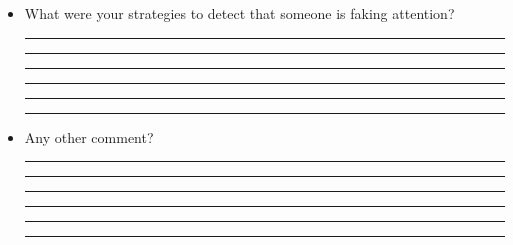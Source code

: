 \documentclass[]{simple-thesis}
\begin{document}
\begin{appendices}
\begin{itemize}

\item What were your strategies to detect that someone is faking attention?

  \rule{\linewidth}{0.1mm}
  \rule{\linewidth}{0.1mm}
  \rule{\linewidth}{0.1mm}
  \rule{\linewidth}{0.1mm}
  \rule{\linewidth}{0.1mm}
  \rule{\linewidth}{0.1mm}

\item Any other comment?

  \rule{\linewidth}{0.1mm}
  \rule{\linewidth}{0.1mm}
  \rule{\linewidth}{0.1mm}
  \rule{\linewidth}{0.1mm}
  \rule{\linewidth}{0.1mm}
  \rule{\linewidth}{0.1mm}

\end{itemize}


\end{appendices}
\end{document}
